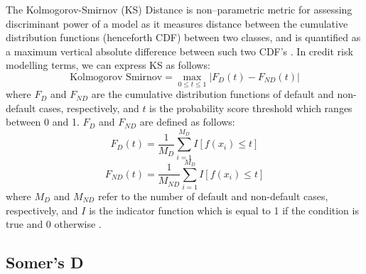 The Kolmogorov-Smirnov (KS) Distance is non--parametric metric for assessing discriminant power of a model as it measures distance between the cumulative distribution functions (henceforth CDF) between two classes, and is quantified as a maximum vertical absolute difference between such two CDF's \citep{adeodato2016equivalence}.
In credit risk modelling terms, we can express KS as follows:
\begin{equation}\label{eq}
    \text{Kolmogorov Smirnov} = \max_{0 \le t \le 1} \left| F_D \left(t \right) - F_{ND} \left(t \right) \right|
\end{equation}
where $F_D$ and $F_{ND}$ are the cumulative distribution functions of default and non-default cases, respectively, and $t$ is the probability score threshold which ranges between 0 and 1. $F_D$ and $F_{ND}$ are defined as follows:
\begin{equation}\label{eq}
    F_D \left(t \right) = \frac{1}{M_D} \sum_{i=1}^{M_D} I \left[f(x_i) \le t \right]
\end{equation}
\begin{equation}\label{eq}
    F_{ND} \left(t \right) = \frac{1}{M_{ND}} \sum_{i=1}^{M_D} I \left[f(x_i) \le t \right]
\end{equation}
where $M_D$ and $M_{ND}$ refer to the number of default and non-default cases, respectively, and $I$ is the indicator function which is equal to 1 if the condition is true and 0 otherwise \citep{doumpos2019analytical}.
 
\subsection{Somer's D}


